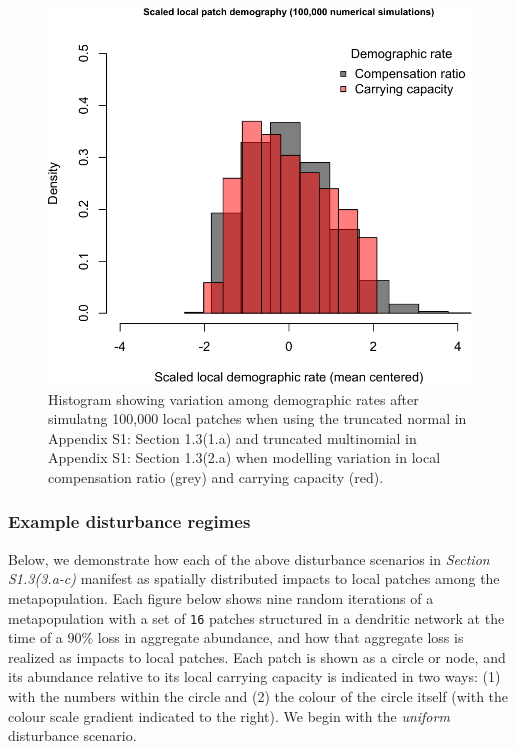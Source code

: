 \documentclass[
]{article}
\begin{document}
\begin{figure}[H]

{\centering \includegraphics{Managing_for_ecological_surprises_in_metapopulations_files/figure-latex/histogram of demographic variation-1} 

}

\caption{Histogram showing variation among demographic rates after simulatng 100,000 local patches when using the truncated normal in Appendix S1: Section 1.3(1.a) and truncated multinomial in Appendix S1: Section 1.3(2.a) when modelling variation in local compensation ratio (grey) and carrying capacity (red).}\label{fig:histogram of demographic variation}
\end{figure}
\newpage

\hypertarget{example-disturbance-regimes}{%
\subsubsection{Example disturbance
regimes}\label{example-disturbance-regimes}}

Below, we demonstrate how each of the above disturbance scenarios in
\emph{Section S1.3(3.a-c)} manifest as spatially distributed impacts to
local patches among the metapopulation. Each figure below shows nine
random iterations of a metapopulation with a set of \texttt{16} patches
structured in a dendritic network at the time of a 90\% loss in
aggregate abundance, and how that aggregate loss is realized as impacts
to local patches. Each patch is shown as a circle or node, and its
abundance relative to its local carrying capacity is indicated in two
ways: (1) with the numbers within the circle and (2) the colour of the
circle itself (with the colour scale gradient indicated to the right).
We begin with the \emph{uniform} disturbance scenario.
\end{document}
